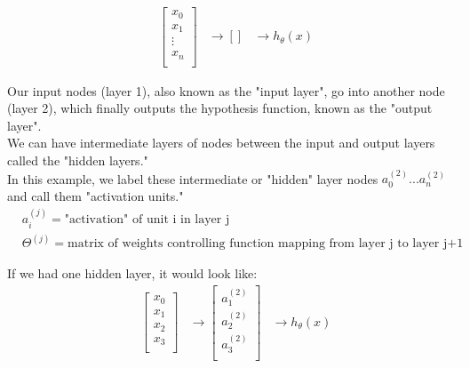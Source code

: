  \begin{equation}
   \begin{aligned}    
     & \begin{bmatrix}
         x_{0} \\
         x_{1} \\
         \vdots    \\ 
         x_{n} \\
       \end{bmatrix} 
     & \rightarrow  [ ] 
     & \rightarrow h_{\theta}(x) 
   \end{aligned}
 \end{equation}

 Our input nodes (layer 1), also known as the "input layer", go into another node (layer 2), which finally outputs the hypothesis function, known as the "output layer".\\

We can have intermediate layers of nodes between the input and output layers called the "hidden layers."\\

In this example, we label these intermediate or "hidden" layer nodes $a_{0}^{(2)} ...  a_{n}^{(2)}$ and call them "activation units."\\

\begin{equation}
  \begin{aligned}
    & a_i^{(j)} = \text{"activation" of unit i in layer j} \\
    & \Theta^{(j)} = \text{matrix of weights controlling function mapping from layer j to layer j+1}
  \end{aligned}
\end{equation}

If we had one hidden layer, it would look like:
 \begin{equation}
   \begin{aligned}    
     & \begin{bmatrix}
         x_{0} \\
         x_{1} \\
         x_{2} \\
         x_{3} \\
       \end{bmatrix} 
     & \rightarrow  \begin{bmatrix}
       a_{1}^(2)\\
       a_{2}^(2)\\
       a_{3}^(2)\\
     \end{bmatrix}
     & \rightarrow h_{\theta}(x) 
   \end{aligned}
 \end{equation} \\
 

